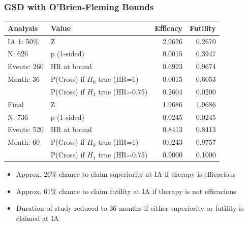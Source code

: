 \documentclass{beamer}
\begin{document}
\begin{frame}
	\frametitle{GSD with O'Brien-Fleming Bounds}
\begin{table}[ht]
	\centering\small
	\begin{tabular}{llrr}
		\hline
		Analysis & Value & Efficacy & Futility \\ 
		\hline
		IA 1: 50\% & Z & 2.9626 & 0.2670 \\ 
		N: 626 & p (1-sided) & 0.0015 & 0.3947 \\ 
		Events: 260 & HR at bound & 0.6923 & 0.9674 \\ 
		Month: 36 & P(Cross) if $H_{0}$ true (HR=1) & 0.0015 & 0.6053 \\ 
		& P(Cross) if $H_{1}$ true (HR=0.75) & 0.2604 & 0.0200 \\ 
		\hline
		Final & Z & 1.9686 & 1.9686 \\ 
		N: 736 & p (1-sided) & 0.0245 & 0.0245 \\ 
		Events: 520 & HR at bound & 0.8413 & 0.8413 \\ 
		Month: 60 & P(Cross) if $H_{0}$ true (HR=1) & 0.0243 & 0.9757 \\ 
		& P(Cross) if $H_{1}$ true (HR=0.75) & 0.9000 & 0.1000 \\ 
		\hline
	\end{tabular}
	\label{tab4}
\end{table}
\begin{itemize}
	\item Approx. 26\% chance to claim superiority at IA if therapy is efficacious 
	\item Approx. 61\% chance to claim futility at IA if therapy is not efficacious 
	\item Duration of study reduced to 36 months if either superiority or futility is claimed at IA
\end{itemize}
	\end{frame}	
	
\end{document}
